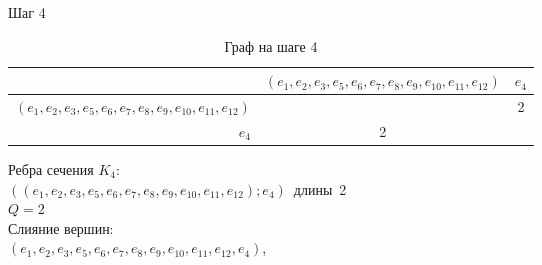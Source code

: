 \bigskip
\noindent
\begin{minipage}{\textwidth}
Шаг 4\\
\begin{table}[H]
\centering
\caption{Граф на шаге 4}
\begin{tabular}{r*{2}{|c}}
&$(e_{1},e_{2},e_{3},e_{5},e_{6},e_{7},e_{8},e_{9},e_{10},e_{11},e_{12})$&$e_{4}$\\
\hline $(e_{1},e_{2},e_{3},e_{5},e_{6},e_{7},e_{8},e_{9},e_{10},e_{11},e_{12})$&&2\\
\hline $e_{4}$&2&\\
\end{tabular}
\end{table}
Ребра сечения $K_{4}$:\\
\mbox{$((e_{1},e_{2},e_{3},e_{5},e_{6},e_{7},e_{8},e_{9},e_{10},e_{11},e_{12});e_{4})$ длины 2}\\
$Q=2$\\
Слияние вершин:\\
\mbox{$(e_{1},e_{2},e_{3},e_{5},e_{6},e_{7},e_{8},e_{9},e_{10},e_{11},e_{12},e_{4})$},
\end{minipage}
